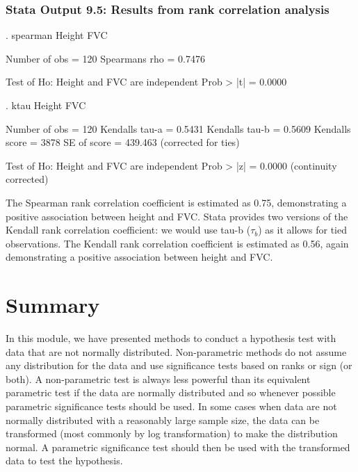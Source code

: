 \documentclass[
]{memoir}
\newenvironment{Shaded}{\begin{snugshade}}{\end{snugshade}}
\newcommand{\NormalTok}[1]{#1}
\begin{document}
\hypertarget{stata-output-9.5-results-from-rank-correlation-analysis}{%
\subsubsection*{Stata Output 9.5: Results from rank correlation analysis}\label{stata-output-9.5-results-from-rank-correlation-analysis}}

\begin{Shaded}
\begin{Highlighting}[]
\NormalTok{. spearman Height FVC}

\NormalTok{ Number of obs =     120}
\NormalTok{Spearman\textquotesingle{}s rho =       0.7476}

\NormalTok{Test of Ho: Height and FVC are independent}
\NormalTok{    Prob \textgreater{} |t| =       0.0000}

\NormalTok{. ktau Height FVC}

\NormalTok{  Number of obs =     120}
\NormalTok{Kendall\textquotesingle{}s tau{-}a =       0.5431}
\NormalTok{Kendall\textquotesingle{}s tau{-}b =       0.5609}
\NormalTok{Kendall\textquotesingle{}s score =    3878}
\NormalTok{    SE of score =     439.463   (corrected for ties)}

\NormalTok{Test of Ho: Height and FVC are independent}
\NormalTok{     Prob \textgreater{} |z| =       0.0000  (continuity corrected)}
\end{Highlighting}
\end{Shaded}

The Spearman rank correlation coefficient is estimated as 0.75, demonstrating a positive association between height and FVC.
Stata provides two versions of the Kendall rank correlation coefficient: we would use tau-b (\(\tau_b\)) as it allows for tied observations. The Kendall rank correlation coefficient is estimated as 0.56, again demonstrating a positive association between height and FVC.

\hypertarget{summary-1}{%
\section{Summary}\label{summary-1}}

In this module, we have presented methods to conduct a hypothesis test with data that are not normally distributed. Non-parametric methods do not assume any distribution for the data and use significance tests based on ranks or sign (or both). A non-parametric test is always less powerful than its equivalent parametric test if the data are normally distributed and so whenever possible parametric significance tests should be used. In some cases when data are not normally distributed with a reasonably large sample size, the data can be transformed (most commonly by log transformation) to make the distribution normal. A parametric significance test should then be used with the transformed data to test the hypothesis.
\end{document}
